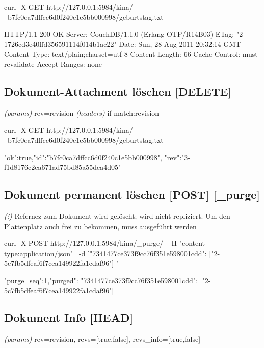 \documentclass[19pt,landscape,twocolumn]{article}
\newcommand{\mono}[1]{\texttt{\textendash\textendash {#1}}}
\newcommand{\htmlverb}[1]{{[}\textbf{{#1}}{]}}
\newcommand{\brackets}[1]{{[}{#1}{]}}
\newcommand{\setparskip}{\setlength{\parskip}{-6mm}}
\newcommand{\resetparskip}{\setlength{\parskip}{1mm}}
\begin{document}
\begin{code}
curl -X GET http://127.0.0.1:5984/kina/ \
  b7fc0ca7dffcc6d0f240c1e5bb000998/geburtstag.txt
\end{code}
\setparskip
\begin{response}
HTTP/1.1 200 OK
Server: CouchDB/1.1.0 (Erlang OTP/R14B03)
ETag: "2-1726cd3e40ffd356591114f014b1ac22"
Date: Sun, 28 Aug 2011 20:32:14 GMT
Content-Type: text/plain;charset=utf-8
Content-Length: 66
Cache-Control: must-revalidate
Accept-Ranges: none
\end{response}
\resetparskip

\subsection{Dokument-Attachment löschen \htmlverb{DELETE}}
\emph{(params)} rev=revision \newline
\emph{(headers)} if-match:revision

\begin{code}
curl -X GET http://127.0.0.1:5984/kina/ \
    b7fc0ca7dffcc6d0f240c1e5bb000998/geburtstag.txt
\end{code}
\setparskip
\begin{response}
{"ok":true,"id":"b7fc0ca7dffcc6d0f240c1e5bb000998",
 "rev":"3-f1d8176c2ea671ad75bd85a55dea4d05"}
\end{response}
\resetparskip

\subsection{Dokument permanent löschen \htmlverb{POST} \htmlverb{\_purge}}
\emph{(!)} Refernez zum Dokument wird gelöscht; wird nicht repliziert. Um den\newline 
Plattenplatz auch frei zu bekommen, muss \mono{\_compact} ausgeführt werden

\begin{code}
curl -X POST http://127.0.0.1:5984/kina/_purge/ \
  -H "content-type:application/json" \
  -d '{"7341477ce373f9cc76f351e598001cdd":
        ["2-5c7fb5dfeaf6f7cea149922fa1cdaf96"]
     }'
\end{code}
\setparskip
\begin{response}
{"purge_seq":1,"purged":{
  "7341477ce373f9cc76f351e598001cdd":
    ["2-5c7fb5dfeaf6f7cea149922fa1cdaf96"]
  }
}
\end{response}
\resetparskip

\subsection{Dokument Info \htmlverb{HEAD}}
\emph{(params)} rev=revision, revs=\brackets{true,false}, revs\_info=\brackets{true,false} 
\end{document}
